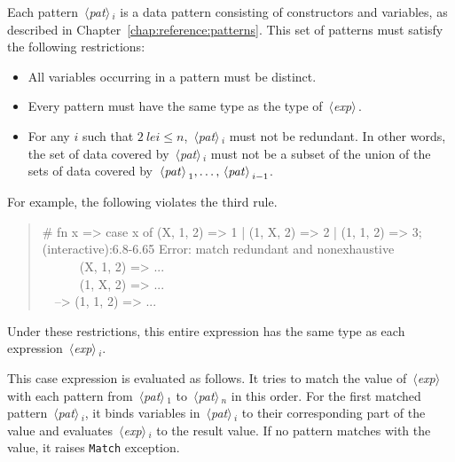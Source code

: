\documentclass{jbook}
\newcommand{\code}[1]{\mbox{\large\tt #1}}
\newcommand{\nonterm}[1]{\mbox{$\,\langle$}{\it #1}\mbox{$\rangle\,$}}
\newcommand{\myem}{\mbox{\ \ }}
\newenvironment{program}{\begin{quote}\begin{tt}}%
                        {\end{tt}\end{quote}}
\begin{document}
	Each pattern \nonterm{pat}$_i$ is a data pattern
consisting of constructors and variables,
as described in Chapter~\ref{chap:reference:patterns}.
	This set of patterns must satisfy the following restrictions:
\begin{itemize}
\item All variables occurring in a pattern must be
distinct.
\item Every pattern must have the same type as the type of \nonterm{exp}.
\item For any $i$ such that $2\ le i \le n$,
\nonterm{pat}$_i$ must not be redundant.
	In other words,
the set of data covered by \nonterm{pat}$_i$
must not be a subset of the union of the sets of data covered by
$\nonterm{pat}_1, \ldots, \nonterm{pat}_{i-1}$.
\end{itemize}
	For example, the following violates the third rule.
\begin{program}
\# fn x => case x of (X, 1, 2) => 1 | (1, X, 2) => 2 | (1, 1, 2) => 3;
\\
(interactive):6.8-6.65 Error: match redundant and nonexhaustive
\\
\myem\myem\myem  (X, 1, 2) => ...
\\
\myem\myem\myem  (1, X, 2) => ...
\\
\myem --> (1, 1, 2) => ...
\end{program}
	Under these restrictions,
this entire expression has the same type as each expression
\nonterm{exp}$_i$.

	This case expression is evaluated as follows.
	It tries to match the value of \nonterm{exp} with
each pattern from \nonterm{pat}$_1$ to \nonterm{pat}$_n$ in this
order.
	For the first matched pattern \nonterm{pat}$_i$,
it binds variables in \nonterm{pat}$_i$ to their corresponding part of
the value and evaluates \nonterm{exp}$_i$ to the result value.
	If no pattern matches with the value,
it raises \code{Match} exception.
\fi%
\end{document}
